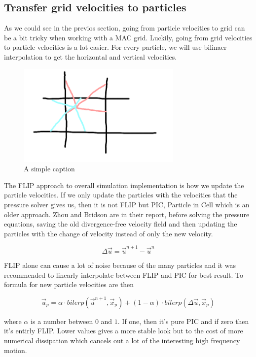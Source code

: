 \subsection{Transfer grid velocities to particles}

As we could see in the previos section, going from particle velocities to grid can be a bit tricky when working with a MAC grid. Luckily, going from grid velocities to particle velocities is a lot easier. For every particle, we will use bilinaer interpolation to get the horizontal and vertical velocities.

\begin{figure}[ht!]
\centering
\includegraphics[width=80mm]{ch3/bilerp.png}
\caption{A simple caption}
\label{onedge}
\end{figure}

The FLIP approach to overall simulation implementation is how we update the particle velocities. If we only update the particles with the velocities that the pressure solver gives us, then it is not FLIP but PIC, Particle in Cell which is an older approach. Zhou and Bridson are in their report, before solving the pressure equations, saving the old divergence-free velocity field and then updating the particles with the change of velocity instead of only the new velocity.

\begin{equation}
\Delta \vec{u} = \vec{u}^{n+1} - \vec{u}^n
\end{equation}

FLIP alone can cause a lot of noise because of the many particles and it was recommended to linearly interpolate between FLIP and PIC for best result. To formula for new particle velocities are then

\begin{equation}
\vec{u}_p = \alpha \cdot bilerp(\vec{u}^{n+1}, \vec{x}_p) + (1-\alpha) \cdot bilerp(\Delta \vec{u},\vec{x}_p)
\label{flipeq}
\end{equation}

where $\alpha$ is a number between $0$ and $1$. If one, then it's pure PIC and if zero then it's entirly FLIP. Lower values gives a more stable look but to the cost of more numerical dissipation which cancels out a lot of the interesting high frequency motion.
